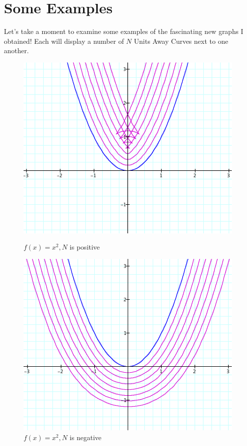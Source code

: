 \section{Some Examples}

Let’s take a moment to examine some examples of the fascinating new graphs I obtained! Each will display a number of $N$ Units Away Curves next to one another.

\begin{figure}[h] 
  \label{example-1} 
  \begin{minipage}[b]{0.5\linewidth}
    \centering
    \includegraphics[width=.9\linewidth]{some-examples-img/Fig 5.png} 
    \caption{$f(x) = x ^ 2, N$ is positive} 
    \label{fig:fig5}
    \vspace{4ex}
  \end{minipage} %
  \begin{minipage}[b]{0.5\linewidth}
    \centering
    \includegraphics[width=.9\linewidth]{some-examples-img/Fig 6.png}
    \caption{$f(x) = x ^ 2, N$ is negative}
    \label{fig:fig6}
    \vspace{4ex}
  \end{minipage} %
\end{figure}


